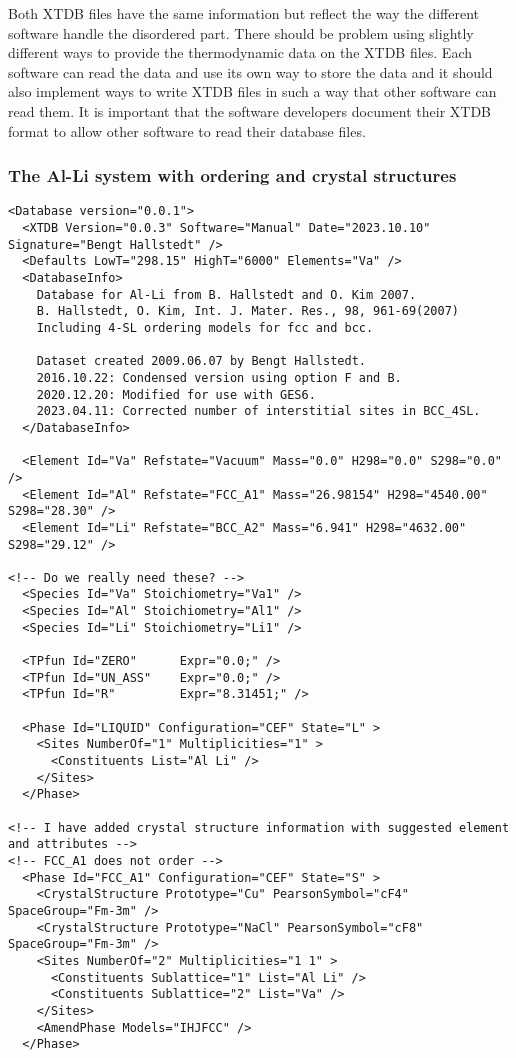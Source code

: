 \documentclass{article}
\begin{document}
\begin{appendices}
Both XTDB files have the same information but reflect the way the
different software handle the disordered part.  There should be
problem using slightly different ways to provide the thermodynamic
data on the XTDB files.  Each software can read the data and use its
own way to store the data and it should also implement ways to write
XTDB files in such a way that other software can read them.  It is
important that the software developers document their XTDB format to
allow other software to read their database files.

\subsubsection{The Al-Li system with ordering and crystal structures}\label{sec:alli1}

\begin{verbatim}
<Database version="0.0.1">
  <XTDB Version="0.0.3" Software="Manual" Date="2023.10.10" Signature="Bengt Hallstedt" />
  <Defaults LowT="298.15" HighT="6000" Elements="Va" />
  <DatabaseInfo>
    Database for Al-Li from B. Hallstedt and O. Kim 2007.
	B. Hallstedt, O. Kim, Int. J. Mater. Res., 98, 961-69(2007)
	Including 4-SL ordering models for fcc and bcc.
	
    Dataset created 2009.06.07 by Bengt Hallstedt.
    2016.10.22: Condensed version using option F and B.
    2020.12.20: Modified for use with GES6.
    2023.04.11: Corrected number of interstitial sites in BCC_4SL.
  </DatabaseInfo>

  <Element Id="Va" Refstate="Vacuum" Mass="0.0" H298="0.0" S298="0.0" />
  <Element Id="Al" Refstate="FCC_A1" Mass="26.98154" H298="4540.00" S298="28.30" />
  <Element Id="Li" Refstate="BCC_A2" Mass="6.941" H298="4632.00" S298="29.12" />

<!-- Do we really need these? -->
  <Species Id="Va" Stoichiometry="Va1" />
  <Species Id="Al" Stoichiometry="Al1" />
  <Species Id="Li" Stoichiometry="Li1" />

  <TPfun Id="ZERO"      Expr="0.0;" />
  <TPfun Id="UN_ASS"    Expr="0.0;" />
  <TPfun Id="R"         Expr="8.31451;" />

  <Phase Id="LIQUID" Configuration="CEF" State="L" >
    <Sites NumberOf="1" Multiplicities="1" >
      <Constituents List="Al Li" />
    </Sites>
  </Phase>

<!-- I have added crystal structure information with suggested element and attributes -->
<!-- FCC_A1 does not order -->
  <Phase Id="FCC_A1" Configuration="CEF" State="S" >
	<CrystalStructure Prototype="Cu" PearsonSymbol="cF4" SpaceGroup="Fm-3m" />
	<CrystalStructure Prototype="NaCl" PearsonSymbol="cF8" SpaceGroup="Fm-3m" />
    <Sites NumberOf="2" Multiplicities="1 1" >
      <Constituents Sublattice="1" List="Al Li" />
      <Constituents Sublattice="2" List="Va" />
    </Sites>
    <AmendPhase Models="IHJFCC" />
  </Phase>


\end{verbatim}
\end{appendices}
\end{document}
